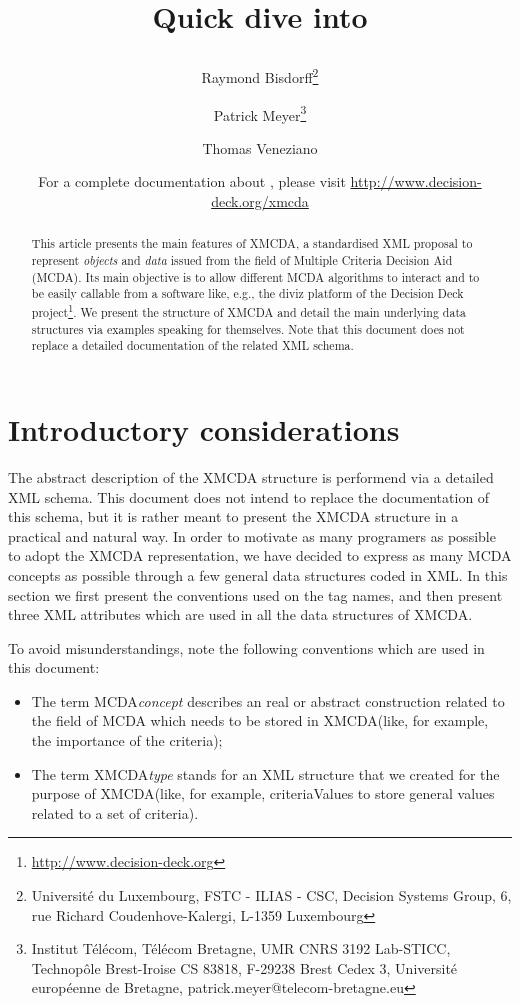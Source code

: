 \documentclass[a4paper,oneside,10 pt]{article}
\title{\begin{huge}Quick dive into \XMCDA-2.0\end{huge}}
\author{Raymond Bisdorff\thanks{Université du Luxembourg, FSTC - ILIAS - CSC, Decision Systems Group, 6, rue Richard Coudenhove-Kalergi, L-1359 Luxembourg} \and Patrick Meyer\thanks{Institut Télécom, Télécom Bretagne, UMR CNRS 3192 Lab-STICC, Technopôle Brest-Iroise CS 83818, F-29238 Brest Cedex 3, Université européenne de Bretagne, {\asciifamily patrick.meyer@telecom-bretagne.eu}}
\and Thomas Veneziano\footnotemark[1]}
\date{For a complete documentation about \XMCDA, please visit  \url{http://www.decision-deck.org/xmcda}}
\newcommand{\XMCDA}{{\asciifamily XMCDA}\xspace}
\newcommand{\XML}{{\asciifamily XML}\xspace}
\newcommand{\MCDA}{MCDA\xspace}
\newcommand{\code}{\asciifamily}
\begin{document}
\maketitle

\begin{abstract}
This article presents the main features of \XMCDA, a standardised \XML proposal to represent {\em objects} and {\em data} issued from the field of Multiple Criteria Decision Aid (\MCDA). Its main objective is to allow different \MCDA algorithms to interact and to be easily callable from a software like, e.g., the diviz platform of the Decision Deck project\footnote{\url{http://www.decision-deck.org}}. We present the structure of \XMCDA and detail the main underlying data structures via examples speaking for themselves. Note that this document does not replace a detailed documentation of the related \XML schema.
\end{abstract}

\tableofcontents




\section{Introductory considerations}

The abstract description of the \XMCDA structure is performend via a detailed \XML schema. This document does not intend to replace the documentation of this schema, but it is rather meant to present the \XMCDA structure in a practical and natural way. In order to motivate as many programers as possible to adopt the \XMCDA representation, we have decided to express as many \MCDA concepts as possible through a few general data structures coded in \XML. In this section we first present the conventions used on the tag names, and then present three \XML attributes which are used in all the data structures of \XMCDA. 

To avoid misunderstandings, note the following conventions which are used in this document: 

\begin{itemize}
 \item The term \MCDA \textit{concept} describes an real or abstract construction related to the field of \MCDA which needs to be stored in \XMCDA (like, for example, the importance of the criteria);
 \item The term \XMCDA \textit{type} stands for an \XML structure that we created for the purpose of \XMCDA (like, for example, {\code criteriaValues} to store general values related to a set of criteria). 
\end{itemize}
\end{document}
